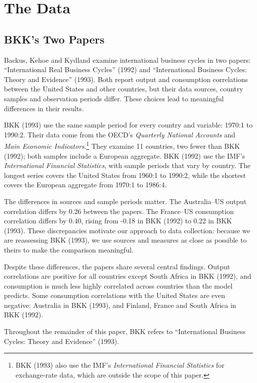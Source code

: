 \section{The Data\label{sec:thedata}}
\subsection{BKK's Two Papers}
Backus, Kehoe and Kydland examine international business cycles in two papers: ``International Real Business Cycles'' (1992) and ``International Business Cycles: Theory and Evidence'' (1993). Both report output and consumption correlations between the United States and other countries, but their data sources, country samples and observation periods differ. These choices lead to meaningful differences in their results.

BKK (1993) use the same sample period for every country and variable: 1970:1 to 1990:2. Their data come from the OECD's \textit{Quarterly National Accounts} and \textit{Main Economic Indicators}.\footnote{BKK (1993) also use the IMF's \textit{International Financial Statistics} for exchange-rate data, which are outside the scope of this paper.} They examine 11 countries, two fewer than BKK (1992); both samples include a European aggregate. BKK (1992) use the IMF's \textit{International Financial Statistics}, with sample periods that vary by country. The longest series covers the United States from 1960:1 to 1990:2, while the shortest covers the European aggregate from 1970:1 to 1986:4.

The differences in sources and sample periods matter. The Australia--US output correlation differs by 0.26 between the papers. The France--US consumption correlation differs by 0.40, rising from -0.18 in BKK (1992) to 0.22 in BKK (1993). These discrepancies motivate our approach to data collection: because we are reassessing BKK (1993), we use sources and measures as close as possible to theirs to make the comparison meaningful.


Despite these differences, the papers share several central findings. Output correlations are positive for all countries except South Africa in BKK (1992), and consumption is much less highly correlated across countries than the model predicts. Some consumption correlations with the United States are even negative: Australia in BKK (1993), and Finland, France and South Africa in BKK (1992).

Throughout the remainder of this paper, BKK refers to ``International Business Cycles: Theory and Evidence'' (1993).


